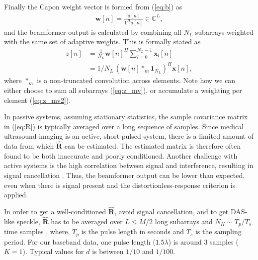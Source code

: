 \documentclass[journal]{IEEEtran}
\newcommand{\mat}[1]{\mathbf{#1}}
\renewcommand{\vec}[1]{\mathbf{#1}}
\begin{document}
Finally the Capon weight vector is formed from (\ref{eq:b}) as
\begin{align}\label{eq:w}
\vec{w}[n] = \frac{\vec{b}[n]}{\vec{1}^H\vec{b}[n]} \in \mathbb{C}^L,
\end{align}
and the beamformer output is calculated by combining all $N_L$ subarrays weighted with the same set of adaptive weights. This is formally stated as
\begin{align}
z[n] &= \frac{1}{N_L}\vec{w}[n]^H \sum_{l=0}^{N_L-1} \vec{x}_l[n] \label{eq:z_mv}\\
&= 1/N_L \, (\vec{w}[n] *_{m} \vec{1}_{N_L})^H\vec{x}[n] \label{eq:z_mv2},
\end{align}
where $*_m$ is a non-truncated convolution across elements.
Note how we can either choose to sum all subarrays (\ref{eq:z_mv}), or accumulate a weighting per element (\ref{eq:z_mv2}).

In passive systems, assuming stationary statistics, the sample covariance matrix in (\ref{eq:R}) is typically averaged over a long sequence of samples\cite{Krima}. Since medical ultrasound imaging is an active, short-pulsed system, there is a limited amount of data from which $\mat{\hat{R}}$ can be estimated. The estimated matrix is therefore often found to be both inaccurate and poorly conditioned. Another challenge with active systems is the high correlation between signal and interference, resulting in signal cancellation \cite{Reddy1987}. Thus, the beamformer output can be lower than expected, even when there is signal present and the distortionless-response criterion is applied. 

In order to get a well-conditioned $\mat{\hat{R}}$, avoid signal cancellation, and to get DAS-like speckle, $\mat{\hat{R}}$ has to be averaged over $L\le M/2$ long subarrays and $N_K \sim T_p/T_s$ time samples \cite{Synnevag2007a}, where, $T_p$ is the pulse length in seconds and $T_s$ is the sampling period. For our baseband data, one pulse length ($1.5\lambda$) is around 3 samples ($K=1$). Typical values for $d$ is between $1/10$ and $1/100$.
\end{document}
